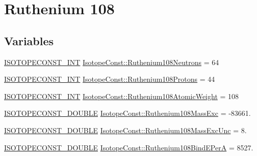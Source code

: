 \hypertarget{group___isotope_const-_ruthenium-_ru108}{}\section{Ruthenium 108}
\label{group___isotope_const-_ruthenium-_ru108}
\subsection*{Variables}
\begin{DoxyCompactItemize}
\item 
\mbox{\hyperlink{group___isotope_const-_macros_ga5f18360b3e99483a35c32d789e62621c}{I\+S\+O\+T\+O\+P\+E\+C\+O\+N\+S\+T\+\_\+\+I\+NT}} \mbox{\hyperlink{group___isotope_const-_ruthenium-_ru108_gafbe75c6455600caf3eea90d013d0e02e}{Isotope\+Const\+::\+Ruthenium108\+Neutrons}} = 64
\item 
\mbox{\hyperlink{group___isotope_const-_macros_ga5f18360b3e99483a35c32d789e62621c}{I\+S\+O\+T\+O\+P\+E\+C\+O\+N\+S\+T\+\_\+\+I\+NT}} \mbox{\hyperlink{group___isotope_const-_ruthenium-_ru108_ga013473c7965c717f776d9ab96925c6a6}{Isotope\+Const\+::\+Ruthenium108\+Protons}} = 44
\item 
\mbox{\hyperlink{group___isotope_const-_macros_ga5f18360b3e99483a35c32d789e62621c}{I\+S\+O\+T\+O\+P\+E\+C\+O\+N\+S\+T\+\_\+\+I\+NT}} \mbox{\hyperlink{group___isotope_const-_ruthenium-_ru108_ga3385c1978604a6a1f7e371dfa68c3d0f}{Isotope\+Const\+::\+Ruthenium108\+Atomic\+Weight}} = 108
\item 
\mbox{\hyperlink{group___isotope_const-_macros_ga8f45a7272ce02c0b4c65c44636ed719a}{I\+S\+O\+T\+O\+P\+E\+C\+O\+N\+S\+T\+\_\+\+D\+O\+U\+B\+LE}} \mbox{\hyperlink{group___isotope_const-_ruthenium-_ru108_gadfa339ccf0095a00173e1396d4bf0926}{Isotope\+Const\+::\+Ruthenium108\+Mass\+Exc}} = -\/83661.
\item 
\mbox{\hyperlink{group___isotope_const-_macros_ga8f45a7272ce02c0b4c65c44636ed719a}{I\+S\+O\+T\+O\+P\+E\+C\+O\+N\+S\+T\+\_\+\+D\+O\+U\+B\+LE}} \mbox{\hyperlink{group___isotope_const-_ruthenium-_ru108_ga92400819d0c290e66364f5675ac09369}{Isotope\+Const\+::\+Ruthenium108\+Mass\+Exc\+Unc}} = 8.
\item 
\mbox{\hyperlink{group___isotope_const-_macros_ga8f45a7272ce02c0b4c65c44636ed719a}{I\+S\+O\+T\+O\+P\+E\+C\+O\+N\+S\+T\+\_\+\+D\+O\+U\+B\+LE}} \mbox{\hyperlink{group___isotope_const-_ruthenium-_ru108_gaa4e5508070941de0e83e70352397455b}{Isotope\+Const\+::\+Ruthenium108\+Bind\+E\+PerA}} = 8527.
\item 

\end{DoxyCompactItemize}
